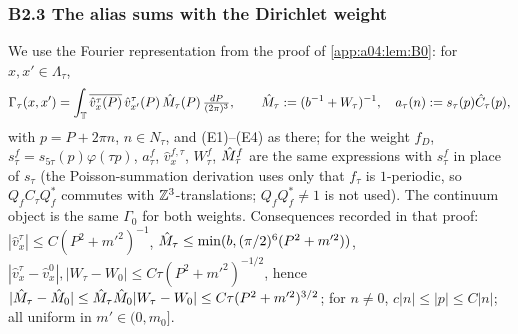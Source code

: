 
\subsubsection*{B2.3 The alias sums with the Dirichlet weight}

We use the Fourier representation from the proof of \cref{app:a04:lem:B0}: for $x,x'\in\Lambda_\tau$,
\[
\Gamma_\tau(x,x')=\int_{\mathbb T}\overline{\hat v^\tau_x(P)}\,\hat v^\tau_{x'}(P)\,\hat M_\tau(P)\,\tfrac{dP}{(2\pi)^3},\qquad \hat M_\tau:=(b^{-1}+W_\tau)^{-1},\quad a_\tau(n):= s_\tau(p)\hat C_\tau(p),
\]
with $p=P+2\pi n$, $n\in N_\tau$, and (E1)--(E4) as there; for the weight $f_D$, $s^f_\tau=s_{5\tau}(p)\varphi(\tau p)$, $a^f_\tau$, $\hat v^{f,\tau}_x$, $W^f_\tau$, $\hat M^f_\tau$ are the same expressions with $s^f_\tau$ in place of $s_\tau$ (the Poisson-summation derivation uses only that $f_\tau$ is $1$-periodic, so $Q_fC_\tau Q_f^*$ commutes with $\mathbb Z^3$-translations; $Q_fQ_f^*\ne1$ is not used). The continuum object is the same $\Gamma_0$ for both weights. Consequences recorded in that proof: $|\hat v^\tau_x|\le C(P^2+m'^2)^{-1}$, $\hat M_\tau\le\min(b,(\pi/2)^6(P^2+m'^2))$, $|\hat v^\tau_x-\hat v^0_x|,|W_\tau-W_0|\le C\tau(P^2+m'^2)^{-1/2}$, hence $|\hat M_\tau-\hat M_0|\le\hat M_\tau\hat M_0|W_\tau-W_0|\le C\tau(P^2+m'^2)^{3/2}$; for $n\ne0$, $c|n|\le|p|\le C|n|$; all uniform in $m'\in(0,m_0]$.

